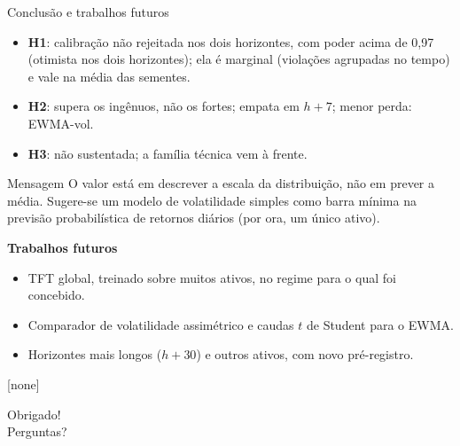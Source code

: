 \documentclass[aspectratio=169,10pt]{beamer}
\newcommand{\hsete}{\(h{+}7\)}
\begin{document}
\begin{frame}{Conclusão e trabalhos futuros}
  \small
  \begin{itemize}
    \item \textbf{H1}: calibração não rejeitada nos dois horizontes, com poder acima
      de 0,97 (otimista nos dois horizontes); ela é marginal (violações agrupadas no tempo) e vale na média das sementes.
    \item \textbf{H2}: supera os ingênuos, não os fortes; empata em \hsete; menor perda: EWMA-vol.
    \item \textbf{H3}: não sustentada; a família técnica vem à frente.
  \end{itemize}
  \begin{block}{Mensagem}
    O valor está em descrever a \alert{escala} da distribuição, não em prever a média.
    Sugere-se um modelo de volatilidade simples como barra mínima na previsão
    probabilística de retornos diários (por ora, um único ativo).
  \end{block}
  \textbf{Trabalhos futuros}
  \begin{itemize}
    \item TFT global, treinado sobre muitos ativos, no regime para o qual foi concebido.
    \item Comparador de volatilidade assimétrico e caudas \(t\) de Student para o EWMA.
    \item Horizontes mais longos (\(h{+}30\)) e outros ativos, com novo pré-registro.
  \end{itemize}
\end{frame}

{
[none]
\begin{frame}[standout]
  Obrigado!\\[6pt]
  {\normalsize Perguntas?}
\end{frame}
}

\appendix
\setcounter{framenumber}{0}
\end{document}
